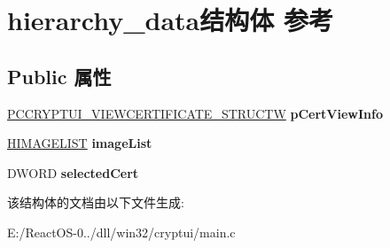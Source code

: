 \hypertarget{structhierarchy__data}{}\section{hierarchy\+\_\+data结构体 参考}
\label{structhierarchy__data}
\subsection*{Public 属性}
\begin{DoxyCompactItemize}
\item 
\mbox{\label{structhierarchy__data_a60350bb8beacb14efb4d055718c8a31e}} 
\hyperlink{structtag_c_r_y_p_t_u_i___v_i_e_w_c_e_r_t_i_f_i_c_a_t_e___s_t_r_u_c_t_w}{P\+C\+C\+R\+Y\+P\+T\+U\+I\+\_\+\+V\+I\+E\+W\+C\+E\+R\+T\+I\+F\+I\+C\+A\+T\+E\+\_\+\+S\+T\+R\+U\+C\+TW} {\bfseries p\+Cert\+View\+Info}
\item 
\mbox{\label{structhierarchy__data_aee0be8e002764a9550313ef6166a8a77}} 
\hyperlink{struct___i_m_a_g_e_l_i_s_t}{H\+I\+M\+A\+G\+E\+L\+I\+ST} {\bfseries image\+List}
\item 
\mbox{\label{structhierarchy__data_a1ebc2fc05e1b4cc305354923a8c2364e}} 
D\+W\+O\+RD {\bfseries selected\+Cert}
\end{DoxyCompactItemize}


该结构体的文档由以下文件生成\+:\begin{DoxyCompactItemize}
\item 
E\+:/\+React\+O\+S-\/0../dll/win32/cryptui/main.\+c\end{DoxyCompactItemize}
